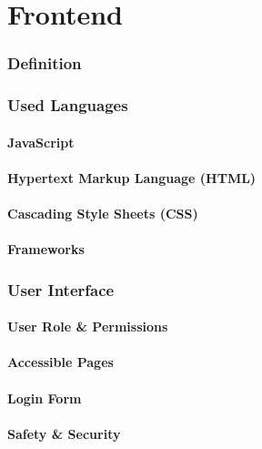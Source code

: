 \part{Frontend}

\section{Definition}

\section{Used Languages}

    \subsection{JavaScript}

    \subsection{Hypertext Markup Language (HTML)}

    \subsection{Cascading Style Sheets (CSS)}

    \subsection{Frameworks}

\section{User Interface}

    \subsection{User Role \& Permissions}
    
    \subsection{Accessible Pages}

    \subsection{Login Form}

    \subsection{Safety \& Security}